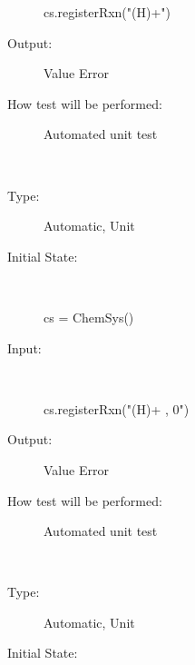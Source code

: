 \documentclass[12pt, titlepage]{article}
\newcounter{testnum} %
\begin{document}
\begin{addmargin}[2em]{0em}
\begin{addmargin}[2em]{0em}
\begin{description}
\begin{python}
cs.registerRxn("(H)+") 
\end{python}
					
\item[Output:] Value Error
					
\item[How test will be performed:] Automated unit test\\
\end{description}
\end{addmargin}


\\
\begin{addmargin}[2em]{0em}
\begin{description}
\item[Type:] Automatic, Unit
					
\item[Initial State:] ~\newline

\begin{python}
cs = ChemSys()
\end{python}
					
\item[Input:] ~\newline

\begin{python}
cs.registerRxn("(H)+ , 0") 
\end{python}
					
\item[Output:] Value Error
					
\item[How test will be performed:] Automated unit test\\
\end{description}
\end{addmargin}


\\
\begin{addmargin}[2em]{0em}
\begin{description}
\item[Type:] Automatic, Unit
					
\item[Initial State:] ~\newline


\end{description}
\end{addmargin}
\end{addmargin}
\end{document}
